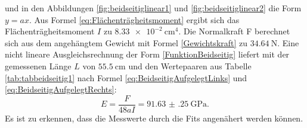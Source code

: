 und in den Abbildungen \ref{fig:beidseitiglinear1} und \ref{fig:beidseitiglinear2} die Form $y=a x$. Aus Formel \eqref{eq:Flächenträgheitsmoment} ergibt sich das Flächenträgheitsmoment $I$ zu $\SI{8.33e-2}{\centi\meter\tothe{4}}$.  Die Normalkraft F berechnet sich aus dem angehängtem Gewicht mit Formel \eqref{Gewichtskraft} zu $\SI{34.64}{\newton}$. Eine nicht lineare Ausgleichsrechnung der Form \eqref{FunktionBeidseitig} liefert mit der gemessenen Länge $L$ von $\SI{55.5}{\centi\meter}$ und den Wertepaaren aus Tabelle \ref{tab:tabbeidseitig1} nach Formel \eqref{eq:BeidseitigAufgelegtLinks} und \eqref{eq:BeidseitigAufgelegtRechts}:
\begin{displaymath}
E = \frac{F}{48 a I}= \SI{91.63(25)}{\giga\pascal}\text{.}
\end{displaymath}
Es ist zu erkennen, dass die Messwerte durch die Fits angenähert werden können.



